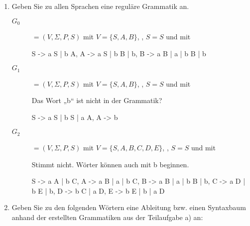 \documentclass{lehramt-informatik-aufgabe}
\begin{document}
\begin{enumerate}


\item Geben Sie zu allen Sprachen eine reguläre Grammatik an.

\begin{liAntwort}

\begin{description}
%

\item[$G_0$]

$= (V, \Sigma, P, S)$ mit
$V = \{S, A, B\}$,
,
$S = S$ und mit

\begin{liProduktionsRegeln}
S -> a S | b A,
A -> a S | b B | b,
B -> a B | a | b B | b
\end{liProduktionsRegeln}

%

\item[$G_1$]

$= (V, \Sigma, P, S)$ mit
$V = \{S, A, B\}$,
,
$S = S$ und mit

Das Wort „b“ ist nicht in der Grammatik?

\begin{liProduktionsRegeln}
S -> a S | b S | a A,
A -> b
\end{liProduktionsRegeln}

%

\item[$G_2$]

$= (V, \Sigma, P, S)$ mit
$V = \{S, A, B, C, D, E\}$,
, $S = S$ und mit

Stimmt nicht. Wörter können auch mit b beginnen.

\begin{liProduktionsRegeln}
S -> a A | b C,
A -> a B | a | b C,
B -> a B | a | b B | b,
C -> a D | b E | b,
D -> b C | a D,
E -> b E | b | a D
\end{liProduktionsRegeln}

\end{description}
\end{liAntwort}


\item Geben Sie zu den folgenden Wörtern eine Ableitung bzw. einen
Syntaxbaum anhand der erstellten Grammatiken aus der Teilaufgabe a) an:


\end{enumerate}
\end{document}
